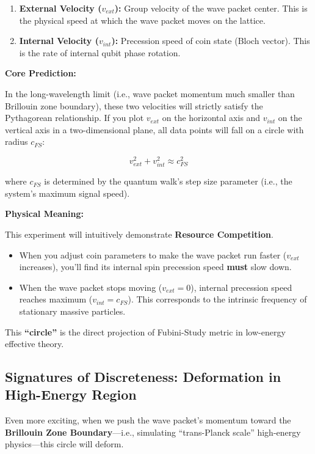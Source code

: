 \documentclass[11pt,a4paper,twoside]{book}
\begin{document}
\begin{enumerate}
\item \textbf{External Velocity ($v_{ext}$):} Group velocity of the wave packet center. This is the physical speed at which the wave packet moves on the lattice.

\item \textbf{Internal Velocity ($v_{int}$):} Precession speed of coin state (Bloch vector). This is the rate of internal qubit phase rotation.
\end{enumerate}

\textbf{Core Prediction:}

In the long-wavelength limit (i.e., wave packet momentum much smaller than Brillouin zone boundary), these two velocities will strictly satisfy the Pythagorean relationship. If you plot $v_{ext}$ on the horizontal axis and $v_{int}$ on the vertical axis in a two-dimensional plane, all data points will fall on a circle with radius $c_{FS}$:

$$v_{ext}^2 + v_{int}^2 \approx c_{FS}^2$$

where $c_{FS}$ is determined by the quantum walk's step size parameter (i.e., the system's maximum signal speed).

\textbf{Physical Meaning:}

This experiment will intuitively demonstrate \textbf{Resource Competition}.

\begin{itemize}
\item When you adjust coin parameters to make the wave packet run faster ($v_{ext}$ increases), you'll find its internal spin precession speed \textbf{must} slow down.

\item When the wave packet stops moving ($v_{ext}=0$), internal precession speed reaches maximum ($v_{int}=c_{FS}$). This corresponds to the intrinsic frequency of stationary massive particles.
\end{itemize}

This \textbf{``circle''} is the direct projection of Fubini-Study metric in low-energy effective theory.

\subsection{Signatures of Discreteness: Deformation in High-Energy Region}

Even more exciting, when we push the wave packet's momentum toward the \textbf{Brillouin Zone Boundary}---i.e., simulating ``trans-Planck scale'' high-energy physics---this circle will deform.
\end{document}
